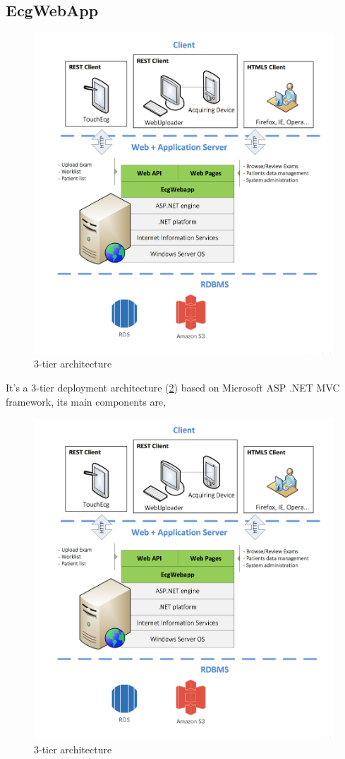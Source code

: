 \subsection{EcgWebApp}
\label{subsection:ecgwebapp}
\begin{figure}
    \includegraphics[width=\textwidth]{img/tiers_diagram}
    \caption{3-tier architecture}
    \label{fig:tiers_diagram}
\end{figure}
It's a 3-tier deployment architecture (\ref{fig:tiers_diagram}) based on Microsoft ASP .NET MVC framework, its main components are,
\begin{figure}
    \includegraphics[width=\textwidth]{img/tiers_diagram}
    \caption{3-tier architecture}
    \label{fig:tiers_diagram}
\end{figure}
